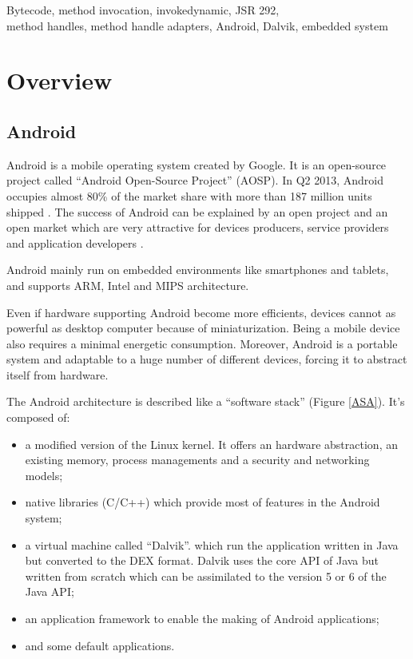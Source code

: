 \documentclass{sig-alternate}
\def \DALVIK{Dalvik\xspace}
\def \ANDROID{Android\xspace}
\def \DEX{DEX\xspace}
\begin{document}


\keywords
Bytecode, method invocation, invokedynamic, JSR 292,\\
method handles, method handle adapters, Android, Dalvik, embedded system

\section{Overview}

  \subsection{Android}

    \ANDROID is a mobile operating system created by Google.
    It is an open-source project called ``\ANDROID Open-Source Project'' (AOSP).
    In Q2 2013, \ANDROID occupies almost 80\% of the market share with more than 187 million units shipped \cite{idc-website}.
    The success of \ANDROID can be explained by an open project and an open market
    which are very attractive for devices producers, service providers and application developers \cite{ieee-butler-android-landscape}\cite{ieee-paulson-shift-dynamic-languages}.

    \ANDROID mainly run on embedded environments like smartphones and tablets,
    and supports ARM, Intel and MIPS architecture.
    
    Even if hardware supporting \ANDROID become more efficients,
    devices cannot as powerful as desktop computer because of miniaturization.
    Being a mobile device also requires a minimal energetic consumption.
    Moreover, \ANDROID is a portable system and adaptable to a huge number of different devices,
    forcing it to abstract itself from hardware.

    The \ANDROID architecture is described like a ``software stack'' (Figure \ref{ASA}).
    It's composed of:
    \begin{itemize}
      \item a modified version of the Linux kernel.
        It offers an hardware abstraction, an existing memory, process managements and a security and networking models;
      \item native libraries (C/C++)
        which provide most of features in the \ANDROID system;
      \item a virtual machine called ``\DALVIK''.
        which run the application written in Java but converted to the \DEX format.
        \DALVIK uses the core API of Java but written from scratch
        which can be assimilated to the version 5 or 6 of the Java API;
      \item an application framework to enable the making of \ANDROID applications;
      \item and some default applications.
    \end{itemize}
\end{document}
